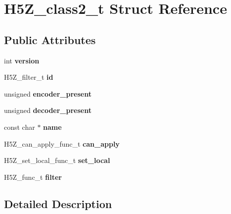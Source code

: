 \hypertarget{struct_h5_z__class2__t}{}\section{H5\+Z\+\_\+class2\+\_\+t Struct Reference}
\label{struct_h5_z__class2__t}
\subsection*{Public Attributes}
\begin{DoxyCompactItemize}
\item 
\mbox{\label{struct_h5_z__class2__t_acde3acc22fae0a83bbb9340ff5ebf26c}} 
int {\bfseries version}
\item 
\mbox{\label{struct_h5_z__class2__t_ad4da70ad39295d08d3998e0d8c8b7fc8}} 
H5\+Z\+\_\+filter\+\_\+t {\bfseries id}
\item 
\mbox{\label{struct_h5_z__class2__t_a4d621ed07a0ea24684ec1eea20bd7317}} 
unsigned {\bfseries encoder\+\_\+present}
\item 
\mbox{\label{struct_h5_z__class2__t_a2b885d3dd52426f9c2bd8ba3b8e62993}} 
unsigned {\bfseries decoder\+\_\+present}
\item 
\mbox{\label{struct_h5_z__class2__t_a4a53eca17d9f5fe8b7adf9cff78e94dd}} 
const char $\ast$ {\bfseries name}
\item 
\mbox{\label{struct_h5_z__class2__t_a6b1fa182365d61fe25a8d903bf1fde89}} 
H5\+Z\+\_\+can\+\_\+apply\+\_\+func\+\_\+t {\bfseries can\+\_\+apply}
\item 
\mbox{\label{struct_h5_z__class2__t_a925e60f004925b12ca5f051e17495b82}} 
H5\+Z\+\_\+set\+\_\+local\+\_\+func\+\_\+t {\bfseries set\+\_\+local}
\item 
\mbox{\label{struct_h5_z__class2__t_a492e49aed76601c2bc50aa2e2d3dd2e6}} 
H5\+Z\+\_\+func\+\_\+t {\bfseries filter}
\end{DoxyCompactItemize}


\subsection{Detailed Description}


